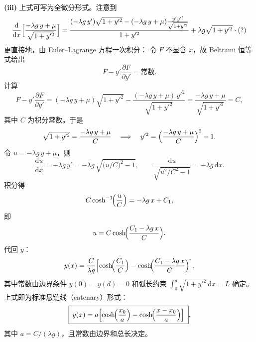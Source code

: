 \begin{question}
\begin{solution}
\textbf{(iii)} 上式可写为全微分形式。注意到
\[
\frac{\mathrm d}{\mathrm dx}\Bigl[\frac{-\lambda g\, y + \mu}{\sqrt{1+y'^2}}\Bigr]
= \frac{(-\lambda g\, y')\sqrt{1+y'^2}
- (-\lambda g\, y + \mu)\frac{y'y''}{\sqrt{1+y'^2}}}{1+y'^2}
+ \lambda g\sqrt{1+y'^2}\cdot\text{(?)}
\]
更直接地，由 Euler--Lagrange 方程一次积分：
令 \(F\) 不显含 \(x\)，故 Beltrami 恒等式给出
\[
F - y'\frac{\partial F}{\partial y'} = \text{常数}.
\]
计算
\[
F - y'\frac{\partial F}{\partial y'}
= (-\lambda g\, y + \mu)\sqrt{1+y'^2}
- \frac{(-\lambda g\, y + \mu)\,y'^2}{\sqrt{1+y'^2}}
= \frac{-\lambda g\, y + \mu}{\sqrt{1+y'^2}} = C,
\]
其中 \(C\) 为积分常数。于是
\[
\sqrt{1+y'^2} = \frac{-\lambda g\, y + \mu}{C}
\quad\Longrightarrow\quad
y'^2 = \Bigl(\frac{-\lambda g\, y + \mu}{C}\Bigr)^2 - 1 .
\]
令 \(u = -\lambda g\, y + \mu\)，则
\[
\frac{\mathrm du}{\mathrm dx} = -\lambda g\, y'
= -\lambda g\,\sqrt{\bigl(u/C\bigr)^2 - 1},
\qquad
\frac{\mathrm du}{\sqrt{u^2/C^2 - 1}} = -\lambda g\,\mathrm dx .
\]
积分得
\[
C\cosh^{-1}\!\Bigl(\frac{u}{C}\Bigr) = -\lambda g\, x + C_1,
\]
即
\[
u = C\cosh\!\Bigl(\frac{C_1 - \lambda g\, x}{C}\Bigr).
\]
代回 \(y\)：
\[
y(x) = \frac{C}{\lambda g}\Bigl[\cosh\!\Bigl(\frac{C_1}{C}\Bigr)
- \cosh\!\Bigl(\frac{C_1 - \lambda g\, x}{C}\Bigr)\Bigr],
\]
其中常数由边界条件 \(y(0)=y(d)=0\) 和弧长约束 \(\int_0^d \sqrt{1+y'^2}\,\mathrm dx = L\) 确定。上式即为标准悬链线（catenary）形式：
\[
\boxed{\;y(x) = a\Bigl[\cosh\!\Bigl(\frac{x_0}{a}\Bigr)
- \cosh\!\Bigl(\frac{x-x_0}{a}\Bigr)\Bigr]\;},
\]
其中 \(a = C/(\lambda g)\)，且常数由边界和总长决定。
\end{solution}
\end{question}

